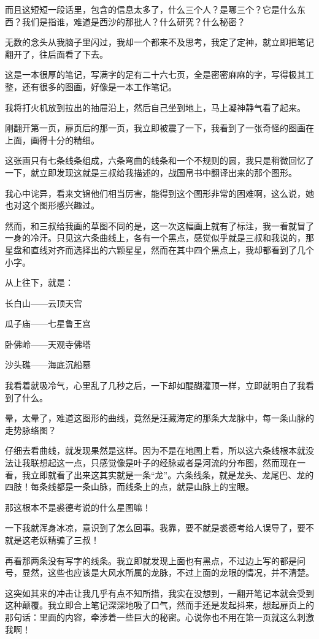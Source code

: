 而且这短短一段话里，包含的信息太多了，什么三个人？是哪三个？它是什么东西？我们是指谁，难道是西沙的那批人？什么研究？什么秘密？

无数的念头从我脑子里闪过，我却一个都来不及思考，我定了定神，就立即把笔记翻开了，往后面看了下去。

这是一本很厚的笔记，写满字的足有二十六七页，全是密密麻麻的字，写得极其工整，还有很多的图画，好像是一本工作笔记。

我将打火机放到拉出的抽屉沿上，然后自己坐到地上，马上凝神静气看了起来。

刚翻开第一页，扉页后的那一页，我立即被震了一下，我看到了一张奇怪的图画在上面，画得十分的精细。

这张画只有七条线条组成，六条弯曲的线条和一个不规则的圆，我只是稍微回忆了一下，就立即发现这就是三叔给我描述的，战国帛书中翻译出来的那个图形。

我心中诧异，看来文锦他们相当厉害，能得到这个图形非常的困难啊，这么说，她也对这个图形感兴趣过。

然而，和三叔给我画的草图不同的是，这一次这幅画上就有了标注，我一看就冒了一身的冷汗。只见这六条曲线上，各有一个黑点，感觉似乎就是三叔和我说的，那星盘和直线对齐而选择出的六颗星星，然而在其中四个黑点上，我却都看到了几个小字。

从上往下，就是：

长白山——云顶天宫

瓜子庙——七星鲁王宫

卧佛岭——天观寺佛塔

沙头礁——海底沉船墓

我看着就吸冷气，心里乱了几秒之后，一下却如醍醐灌顶一样，立即就明白了我看到了什么。

晕，太晕了，难道这图形的曲线，竟然是汪藏海定的那条大龙脉中，每一条山脉的走势脉络图？

仔细去看曲线，就发现果然是这样。因为不是在地图上看，所以这六条线根本就没法让我联想起这一点，只感觉像是叶子的经脉或者是河流的分布图，然而现在一看，我立即就看了出来这其实就是一条“龙”。六条线条，就是龙头、龙尾巴、龙的四肢！每条线都是一条山脉，而线条上的点，就是山脉上的宝眼。

那这根本不是裘德考说的什么星图嘛！

一下我就浑身冰凉，意识到了怎么回事。我靠，要不就是裘德考给人误导了，要不就是这老妖精骗了三叔！

再看那两条没有写字的线条。我立即就发现上面也有黑点，不过边上写的都是问号，显然，这些也应该是大风水所属的龙脉，不过上面的龙眼的情况，并不清楚。

这突如其来的冲击让我几乎有点不知所措，我实在没想到，一翻开笔记本就会受到这种颠覆。我立即合上笔记深深地吸了口气，然而手还是发起抖来，想起扉页上的那句话：里面的内容，牵涉着一些巨大的秘密。心说你也不用在第一页就这么刺激我啊！

